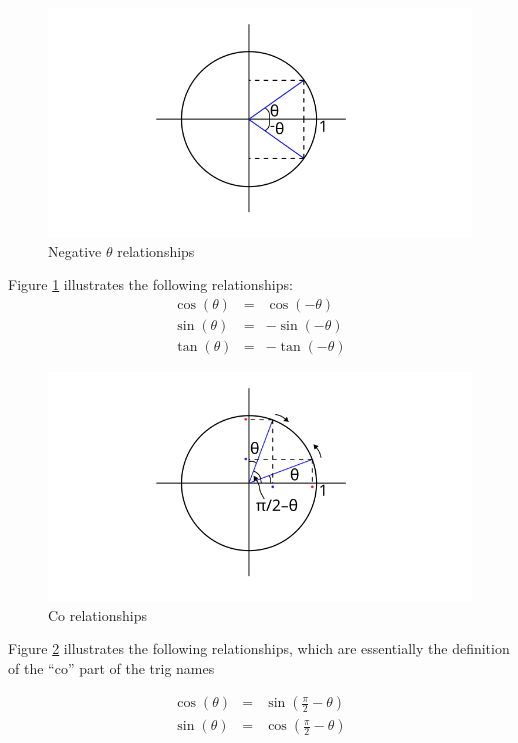 \documentclass[a5paper]{article}
\begin{document}
\begin{figure}[h]
  \includegraphics{trig-unit-circle-negative-theta}
  \caption{Negative $\theta$ relationships}
   \label{fig:2}
\end{figure}

\vbox{
Figure \ref{fig:2} illustrates the following relationships:
\begin{eqnarray}
\cos(\theta)&=&\cos(-\theta)\\
\sin(\theta)&=&-\sin(-\theta)\\
\tan(\theta)&=& -\tan(-\theta)
\end{eqnarray}
}

\begin{figure}[h]
  \includegraphics{trig-unit-circle-90}
  \caption{Co relationships}
   \label{fig:4}
\end{figure}

Figure \ref{fig:4} illustrates the following relationships, which are
essentially the definition of the ``co'' part of the trig names

\begin{eqnarray}
  \cos(\theta)&=&\sin(\frac{\pi}{2} - \theta)\\
  \sin(\theta)&=&\cos(\frac{\pi}{2} - \theta)
\end{eqnarray}
\end{document}
